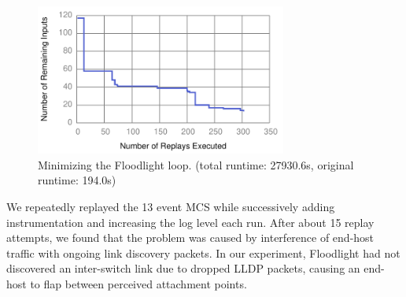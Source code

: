 \begin{figure}[t]
    \includegraphics[width=3.25in]{../graphs/runtime/floodlight_loop.pdf}
    \caption[]{\label{fig:fl_loop} Minimizing the Floodlight loop. (total
    runtime: 27930.6s, original runtime: 194.0s)}
\end{figure}

We repeatedly replayed the 13 event MCS while successively adding
instrumentation and increasing the log level each run. After about 15 replay
attempts, we found that the problem was caused by interference of end-host
traffic with ongoing link discovery packets. In our experiment, Floodlight had
not discovered an inter-switch link due to dropped LLDP packets, causing an
end-host to flap between perceived attachment points.

